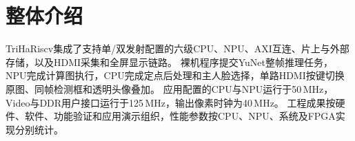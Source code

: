 \section{整体介绍}

TriHaRiscv集成了支持单/双发射配置的六级CPU、NPU、AXI互连、片上与外部存储，以及HDMI采集和全屏显示链路。
裸机程序提交YuNet整帧推理任务，NPU完成计算图执行，CPU完成定点后处理和主人脸选择，单路HDMI按键切换原图、同帧检测框和透明头像叠加。
应用配置的CPU与NPU运行于50\,MHz，Video与DDR用户接口运行于125\,MHz，输出像素时钟为40\,MHz。
工程成果按硬件、软件、功能验证和应用演示组织，性能参数按CPU、NPU、系统及FPGA实现分别统计。


